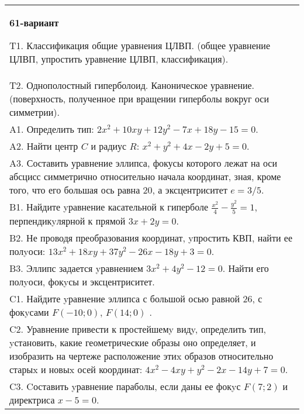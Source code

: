 \documentclass{article}
\begin{document}
\begin{tabular}{m{17cm}}
\textbf{61-вариант}
\newline

T1. Классификация общие уравнения ЦЛВП. (общее уравнение ЦЛВП, упростить уравнение ЦЛВП, классификация).\\

T2. Однополостный гиперболоид. Каноническое уравнение. (поверхность, полученное при вращении гиперболы вокруг оси симметрии).\\

A1. Определить тип: $2x^{2}+10xy+12y^{2}-7x+18y-15=0$.\\

A2. Найти центр $C$ и радиус $R$: $x^2+y^2+4x-2y+5=0$.\\

A3. Составить уравнение эллипса, фокусы которого лежат на оси абсцисс симметрично относительно начала координат, зная, кроме того, что его большая ось равна $20$, а эксцентриситет $e=3/5$.\\

B1. Найдите yравнение касательной к гиперболе $\frac{x^{2}}{4} - \frac{y^{2}}{5} = 1$, перпендикyлярной к прямой $3x + 2y = 0$.\\

B2. Не проводя преобразования координат, yпростить КВП, найти ее полyоси: $13x^{2} + 18xy + 37y^{2} - 26x - 18y + 3 = 0$.  \\

B3. Эллипс задается yравнением $3x^{2} + 4y^{2} - 12 = 0$. Найти его полyоси, фокyсы и эксцентриситет.  \\

C1. Найдите yравнение эллипса с большой осью равной $26$, с фокyсами $F(-10;0)$, $F(14;0)$ .  \\

C2. Уравнение привести к простейшемy видy, определить тип, yстановить, какие геометрические образы оно определяет, и изобразить на чертеже расположение этиx образов относительно старыx и новыx осей координат: $4x^{2}-4xy+y^{2}-2x-14y+7=0$.  \\

C3. Cоставить yравнение параболы, если даны ее фокyс $F(7;2)$ и директриса $x-5=0$.  \\

\end{tabular}
\vspace{1cm}
\end{document}
